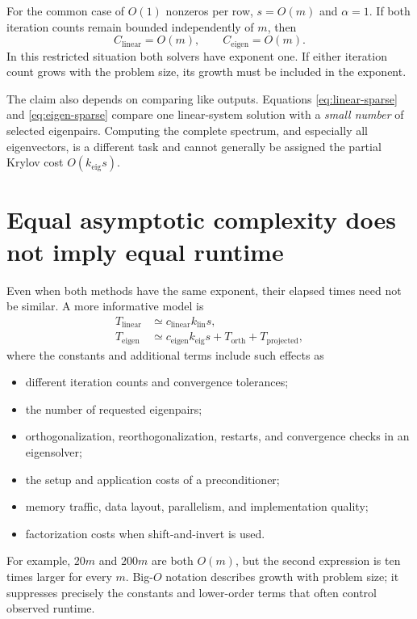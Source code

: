 \documentclass[11pt,a4paper]{article}
\begin{document}
For the common case of $O(1)$ nonzeros per row, $s=O(m)$ and $\alpha=1$.
If both iteration counts remain bounded independently of $m$, then
\begin{equation}
  C_{\mathrm{linear}}=O(m),
  \qquad
  C_{\mathrm{eigen}}=O(m).
\end{equation}
In this restricted situation both solvers have exponent one.  If either
iteration count grows with the problem size, its growth must be included in
the exponent.

The claim also depends on comparing like outputs.  Equations
\eqref{eq:linear-sparse} and \eqref{eq:eigen-sparse} compare one linear-system
solution with a \emph{small number} of selected eigenpairs.  Computing the
complete spectrum, and especially all eigenvectors, is a different task and
cannot generally be assigned the partial Krylov cost $O(k_{\mathrm{eig}}s)$.

\section{Equal asymptotic complexity does not imply equal runtime}

Even when both methods have the same exponent, their elapsed times need not be
similar.  A more informative model is
\begin{align}
  T_{\mathrm{linear}}
    &\simeq c_{\mathrm{linear}}k_{\mathrm{lin}}s,\\
  T_{\mathrm{eigen}}
    &\simeq c_{\mathrm{eigen}}k_{\mathrm{eig}}s
      +T_{\mathrm{orth}}+T_{\mathrm{projected}},
\end{align}
where the constants and additional terms include such effects as
\begin{itemize}
  \item different iteration counts and convergence tolerances;
  \item the number of requested eigenpairs;
  \item orthogonalization, reorthogonalization, restarts, and convergence
        checks in an eigensolver;
  \item the setup and application costs of a preconditioner;
  \item memory traffic, data layout, parallelism, and implementation quality;
  \item factorization costs when shift-and-invert is used.
\end{itemize}

For example, $20m$ and $200m$ are both $O(m)$, but the second expression is ten
times larger for every $m$.  Big-$O$ notation describes growth with problem
size; it suppresses precisely the constants and lower-order terms that often
control observed runtime.
\end{document}
